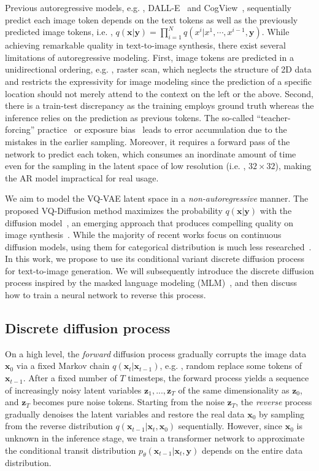 Previous autoregressive models, e.g. , DALL-E~\cite{ramesh2021zero} and CogView~\cite{ding2021cogview}, sequentially predict each image token depends on the text tokens as well as the previously predicted image tokens, i.e. , $q(\bm{x}|\bm{y}) = \prod_{i=1}^N q({x}^i|x^1,\cdots,x^{i-1},\bm{y})$. While achieving remarkable quality in text-to-image synthesis, there exist several limitations of autoregressive modeling. First, image tokens are predicted in a unidirectional ordering, e.g. , raster scan, which neglects the structure of 2D data and restricts the expressivity for image modeling since the prediction of a specific location should not merely attend to the context on the left or the above. Second, there is a train-test discrepancy as the training employs ground truth whereas the inference relies on the prediction as previous tokens. The so-called “teacher-forcing” practice~\cite{esser2021imagebart} or exposure bias~\cite{schmidt2019generalization} leads to error accumulation due to the mistakes in the earlier sampling. Moreover, it requires a forward pass of the network to predict each token, which consumes an inordinate amount of time even for the sampling in the latent space of low resolution (i.e. , $32\times 32$), making the AR model impractical for real usage. 

We aim to model the VQ-VAE latent space in a \emph{non-autoregressive} manner. The proposed VQ-Diffusion method maximizes the probability $q(\bm{x}|\bm{y})$ with the diffusion model~\cite{sohl2015deep,ho2020denoising}, an emerging approach that  produces compelling quality on image synthesis~\cite{dhariwal2021diffusion}. While the majority of recent works focus on continuous diffusion models, using them for categorical distribution is much less researched~\cite{hoogeboom2021argmax,austin2021structured}.  In this work, we propose to use its conditional variant discrete diffusion process for text-to-image generation. We will subsequently introduce the discrete diffusion process inspired by the masked language modeling (MLM)~\cite{devlin2018bert}, and then discuss how to train a neural network to reverse this process. 

\subsection{Discrete diffusion process}

On a high level,  the \emph{forward} diffusion process gradually corrupts the image data $\bm{x}_0$ via a fixed Markov chain $q(\bm{x}_{t}|\bm{x}_{t-1})$, e.g. , random replace some tokens of $\bm{x}_{t-1}$.  After a fixed number of $T$ timesteps, the forward process yields a sequence of increasingly noisy latent variables $\bm{z}_1,...,\bm{z}_T$ of the same dimensionality as $\bm{z}_0$, and $\bm{z}_T$ becomes pure noise tokens. Starting from the noise $\bm{z}_T$, the \emph{reverse} process gradually denoises the latent variables and restore the real data $\bm{x}_0$ by sampling from the reverse distribution $q(\bm{x}_{t-1}|\bm{x}_t, \bm{x}_0)$ sequentially. However, since $\bm{x}_0$ is unknown in the inference stage, we train a transformer network to approximate the conditional transit distribution $p_\theta(\bm{x}_{t-1}|\bm{x}_t, \bm{y})$ depends on the entire data distribution.

